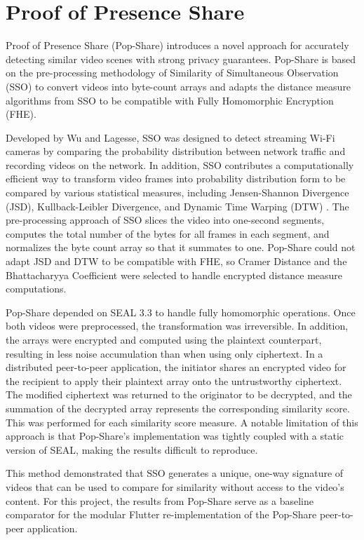 \section{Proof of Presence Share}
\label{sec:Related Pop-Share}
Proof of Presence Share (Pop-Share) \cite{Lagesse2021-PopShare} introduces a novel approach for accurately detecting similar video scenes with strong privacy guarantees. Pop-Share is based on the pre-processing methodology of Similarity of Simultaneous Observation (SSO) \cite{Wu2019-SSO} to convert videos into byte-count arrays and adapts the distance measure algorithms from SSO to be compatible with Fully Homomorphic Encryption (FHE).

Developed by Wu and Lagesse, SSO was designed to detect streaming Wi-Fi cameras by comparing the probability distribution between network traffic and recording videos on the network. In addition, SSO contributes a computationally efficient way to transform video frames into probability distribution form to be compared by various statistical measures, including Jensen-Shannon Divergence (JSD), Kullback-Leibler Divergence, and Dynamic Time Warping (DTW) \cite{Sakoe1978-dtw}. The pre-processing approach of SSO slices the video into one-second segments, computes the total number of the bytes for all frames in each segment, and normalizes the byte count array so that it summates to one. Pop-Share could not adapt JSD and DTW to be compatible with FHE, so Cramer Distance and the Bhattacharyya Coefficient were selected to handle encrypted distance measure computations.

Pop-Share depended on SEAL 3.3 to handle fully homomorphic operations. Once both videos were preprocessed, the transformation was irreversible. In addition, the arrays were encrypted and computed using the plaintext counterpart, resulting in less noise accumulation than when using only ciphertext. In a distributed peer-to-peer application, the initiator shares an encrypted video for the recipient to apply their plaintext array onto the untrustworthy ciphertext. The modified ciphertext was returned to the originator to be decrypted, and the summation of the decrypted array represents the corresponding similarity score. This was performed for each similarity score measure. A notable limitation of this approach is that Pop-Share's implementation was tightly coupled with a static version of SEAL, making the results difficult to reproduce.

This method demonstrated that SSO generates a unique, one-way signature of videos that can be used to compare for similarity without access to the video's content. For this project, the results from Pop-Share serve as a baseline comparator for the modular Flutter re-implementation of the Pop-Share peer-to-peer application.
